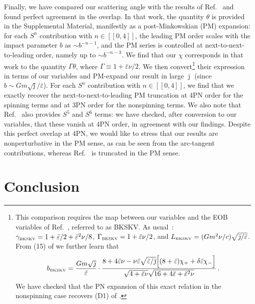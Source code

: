 \documentclass[prd,superscriptaddress,preprintnumbers,tightenlines,nofootinbib, eqsecnum]{revtex4-2}
\begin{document}
Finally, we have compared our scattering angle with the results of Ref.~\cite{Bautista:2024agp} and found perfect agreement in the overlap. In that work, the quantity $\theta$ is provided in the Supplemental Material, manifestly as a post-Minkowskian (PM) expansion: for each $S^n$ contribution with $n\in[\![0,4]\!]$, the leading PM order scales with the impact parameter $b$ as $\sim b^{-n-1}$, and the PM series is controlled at next-to-next-to-leading order, namely up to $\sim b^{-n-3}$. We find that our $\chi$ corresponds in that work to the quantity $\Gamma \theta$, where $\Gamma\equiv1+\bar\varepsilon \nu/2$. We then  
convert\footnote{This comparison requires the map between our variables and the EOB variables of  Ref.~\cite{Bautista:2024agp}, referred to as BKSKV. As usual~\cite{Trestini:2025yyc}: $\gamma_\text{\tiny BKSKV} = 1+\bar\varepsilon/2+ \bar\varepsilon^2\nu/8$, $\Gamma_\text{\tiny BKSKV}=1+\bar\varepsilon \nu/2$, and $L_\text{\tiny BKSKV}=(G m^2 \nu/c)\sqrt{\bar\jmath/\bar\varepsilon}$. From (15) of \cite{Bautista:2024agp} we further learn that
$$b_\text{\tiny BKSKV} = \frac{G m \sqrt{\bar\jmath}}{\bar\varepsilon} \cdot \frac{ 8+4\bar\varepsilon\nu -   \nu\bar\varepsilon \sqrt{\bar\varepsilon/\bar\jmath}\Big[(8+\bar\varepsilon)\chi_+ + \delta \bar\varepsilon \chi_-\Big]}{ \sqrt{4+ \bar\varepsilon \nu} \sqrt{16+4 \bar\varepsilon + \bar\varepsilon^2 \nu}}\,. $$
We have checked that the PN expansion of this exact relation in the nonspinning case recovers (D1) of \cite{Usseglio:2025iwt}. }
their expression in terms of our variables and PM-expand our result in large $\bar\jmath$ (since $b \sim {G m \sqrt{\bar\jmath}}/{\bar\varepsilon}$). For each $S^n$ contribution with $n\in[\![0,4]\!]$, we find that we exactly recover the next-to-next-to-leading PM truncation at 4PN order for the spinning terms and at 3PN order for the nonspinning terms. We also note that Ref.~\cite{Bautista:2024agp} also provides $S^5$ and $S^6$ terms: we have checked, after conversion to our variables, that these vanish at 4PN order, in agreement with our findings. Despite this perfect overlap at 4PN, we would like to stress that our results are nonperturbative in the PM sense, as can be seen from the arc-tangent contributions, whereas  Ref.~\cite{Bautista:2024agp} is truncated in the PM sense.

 
 
\section{Conclusion}
\label{sec:conclusion}
\end{document}
